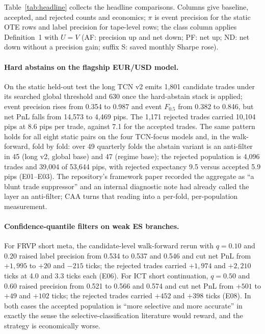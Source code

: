 \documentclass[10pt]{article}
\newcommand{\AF}{Anti-Filter Effect}
\newcommand{\CAA}{Counterfactual Abstain Attribution}
\begin{document}
Table~\ref{tab:headline} collects the headline comparisons. Columns give baseline, accepted, and rejected counts and economics; $\pi$ is event precision for the static OTE rows and label precision for tape-level rows; the class column applies Definition~1 with $U=V$ (AF: precision up and net down; PF: net up; ND: net down without a precision gain; suffix S: saved monthly Sharpe rose).

\begin{table}[t]
\centering
\caption{Headline \CAA. $N$ counts trades, $\pi$ precision, $e$ expectancy (per trade), $V$ net PnL; subscripts $B$ (baseline), $A$ (accepted), $R$ (rejected). Units are pips for OTE rows and ES ticks otherwise. Static rows are the 2026-04-03 and 2026-05-28 held-out test splits; all other rows are walk-forward runs matched on the exact trade key. Class: AF = \AF\ ($\pi\uparrow$, $V\downarrow$), PF = pro-filter ($V\uparrow$), ND = net down without precision gain, +S = saved Sharpe rose.}
\label{tab:headline}
\resizebox{\textwidth}{!}{}
\end{table}

\paragraph{Hard abstains on the flagship EUR/USD model.} On the static held-out test the long TCN v2 emits 1,801 candidate trades under its searched global threshold and 630 once the hard-abstain stack is applied; event precision rises from 0.354 to 0.987 and event $F_{0.5}$ from 0.382 to 0.846, but net PnL falls from 14,573 to 4,469 pips. The 1,171 rejected trades carried 10,104 pips at 8.6 pips per trade, against 7.1 for the accepted trades. The same pattern holds for all eight static pairs on the four TCN-focus models and, in the walk-forward, fold by fold: over 49 quarterly folds the abstain variant is an anti-filter in 45 (long v2, global base) and 47 (regime base); the rejected population is 4,096 trades and 39,004 of 53,644 pips, with rejected expectancy 9.5 versus accepted 5.9 pips (E01--E03). The repository's framework paper recorded the aggregate as ``a blunt trade suppressor'' and an internal diagnostic note had already called the layer an anti-filter; CAA turns that reading into a per-fold, per-population measurement.

\paragraph{Confidence-quantile filters on weak ES branches.} For FRVP short meta, the candidate-level walk-forward rerun with $q=0.10$ and $0.20$ raised label precision from 0.534 to 0.537 and 0.546 and cut net PnL from $+1{,}995$ to $+20$ and $-215$ ticks; the rejected trades carried $+1{,}974$ and $+2{,}210$ ticks at 4.0 and 3.3 ticks each (E06). For ICT short continuation, $q=0.50$ and $0.60$ raised precision from 0.521 to 0.566 and 0.574 and cut net PnL from $+501$ to $+49$ and $+102$ ticks; the rejected trades carried $+452$ and $+398$ ticks (E08). In both cases the accepted population is ``more selective and more accurate'' in exactly the sense the selective-classification literature would reward, and the strategy is economically worse.
\end{document}
